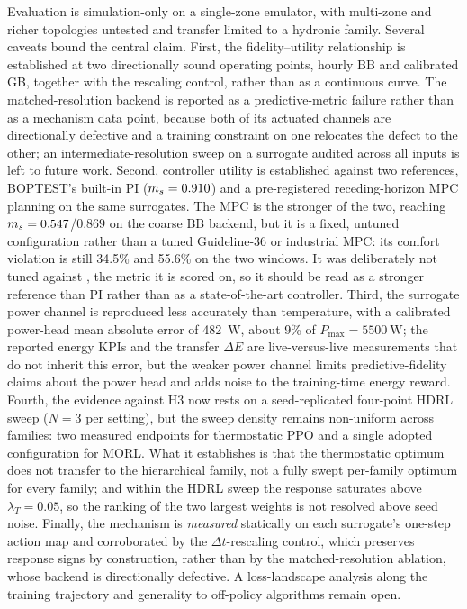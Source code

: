 Evaluation is simulation-only on a single-zone emulator, with multi-zone and richer topologies
untested and transfer limited to a hydronic family. Several caveats bound the central claim. First,
the fidelity--utility relationship is established at two directionally sound operating points,
hourly BB and calibrated GB, together with the rescaling control, rather than as a continuous curve.
The matched-resolution backend is reported as a predictive-metric failure rather than as a
mechanism data point, because both of its actuated channels are directionally defective and a
training constraint on one relocates the defect to the other; an intermediate-resolution sweep on a
surrogate audited across all inputs is left to future work.
Second, controller utility is established against two references, BOPTEST's built-in PI
($m_s=0.910$) and a pre-registered receding-horizon MPC planning on the same surrogates. The MPC is
the stronger of the two, reaching $m_s=0.547$/$0.869$ on the coarse BB backend, but it is a fixed,
untuned configuration rather than a tuned Guideline-36 or industrial MPC: its comfort violation is
still 34.5\% and 55.6\% on the two windows. It was deliberately not tuned against \ms{}, the metric
it is scored on, so it should be read as a stronger reference than PI rather than as a
state-of-the-art controller. Third, the surrogate power channel is
reproduced less accurately than temperature, with a calibrated power-head mean absolute error of
\SI{482}{\watt}, about 9\% of $P_{\max}=\SI{5500}{\watt}$; the reported energy KPIs and the transfer
$\Delta E$ are live-versus-live measurements that do not inherit this error, but the weaker power
channel limits predictive-fidelity claims about the power head and adds noise to the training-time
energy reward. Fourth, the evidence against H3 now rests on a seed-replicated four-point HDRL
sweep ($N=3$ per setting), but the sweep density remains non-uniform across families: two measured
endpoints for thermostatic PPO and a single adopted configuration for MORL. What it establishes is
that the thermostatic optimum does not transfer to the hierarchical family, not a fully swept
per-family optimum for every family; and within the HDRL sweep the response saturates above
$\lambda_T=0.05$, so the ranking of the two largest weights is not resolved above seed noise. Finally, the mechanism is
\emph{measured} statically on each surrogate's one-step action map and corroborated by the
$\Delta t$-rescaling control, which preserves response signs by construction, rather than by the
matched-resolution ablation, whose backend is directionally defective. A loss-landscape analysis
along the training trajectory and generality to off-policy algorithms remain open.
